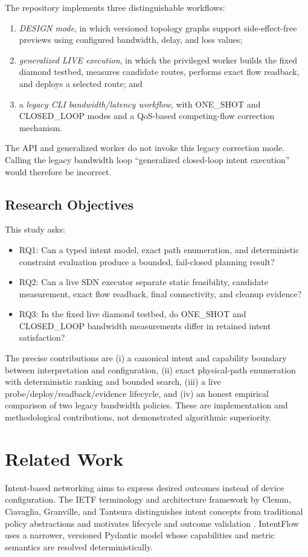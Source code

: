 \documentclass[conference]{IEEEtran}
\begin{document}
The repository implements three distinguishable workflows:
\begin{enumerate}
\item \emph{DESIGN mode}, in which versioned topology graphs support
side-effect-free previews using configured bandwidth, delay, and loss values;
\item \emph{generalized LIVE execution}, in which the privileged worker builds
the fixed diamond testbed, measures candidate routes, performs exact flow
readback, and deploys a selected route; and
\item a \emph{legacy CLI bandwidth/latency workflow}, with
ONE\_SHOT and CLOSED\_LOOP modes and a QoS-based competing-flow correction
mechanism.
\end{enumerate}
The API and generalized worker do not invoke this legacy correction mode.
Calling the legacy bandwidth loop ``generalized closed-loop intent execution''
would therefore be incorrect.

\subsection{Research Objectives}
This study asks:
\begin{itemize}
\item RQ1: Can a typed intent model, exact path enumeration, and deterministic
constraint evaluation produce a bounded, fail-closed planning result?
\item RQ2: Can a live SDN executor separate static feasibility, candidate
measurement, exact flow readback, final connectivity, and cleanup evidence?
\item RQ3: In the fixed live diamond testbed, do ONE\_SHOT and
CLOSED\_LOOP bandwidth measurements differ in retained intent satisfaction?
\end{itemize}

The precise contributions are (i) a canonical intent and capability boundary
between interpretation and configuration, (ii) exact physical-path
enumeration with deterministic ranking and bounded search, (iii) a live
probe/deploy/readback/evidence lifecycle, and (iv) an honest empirical
comparison of two legacy bandwidth policies. These are implementation and
methodological contributions, not demonstrated algorithmic superiority.

\section{Related Work}
Intent-based networking aims to express desired outcomes instead of device
configuration. The IETF terminology and architecture framework by Clemm,
Ciavaglia, Granville, and Tantsura distinguishes intent concepts from
traditional policy abstractions and motivates lifecycle and outcome
validation \cite{rfc9315}. IntentFlow uses a narrower, versioned Pydantic
model whose capabilities and metric semantics are resolved deterministically.
\end{document}
